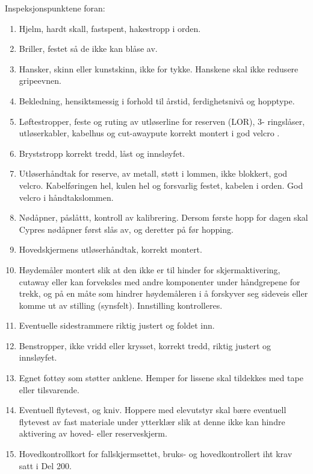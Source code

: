 Inspeksjonspunktene foran:
\begin{enumerate}
	\item Hjelm, hardt skall, fastspent, hakestropp i orden.
	\item Briller, festet så de ikke kan blåse av.
	\item Hansker, skinn eller kunstskinn, ikke for tykke. Hanskene skal ikke redusere gripeevnen.
	\item Bekledning, hensiktsmessig i forhold til årstid, ferdighetsnivå og hopptype.
	\item Løftestropper, feste og ruting av utløserline for reserven (LOR), 3- ringslåser, utløserkabler, kabelhus og cut-awaypute korrekt montert i god velcro .
	\item Bryststropp korrekt tredd, låst og innsløyfet.
	\item Utløserhåndtak for reserve, av metall, støtt i lommen, ikke blokkert, god velcro. Kabelføringen hel, kulen hel og forsvarlig festet, kabelen i orden. God velcro i håndtakslommen.
	\item Nødåpner, påslåttt, kontroll av kalibrering. Dersom første hopp for dagen skal Cypres nødåpner først slås av, og deretter på før hopping.
	\item Hovedskjermens utløserhåndtak, korrekt montert.
	\item Høydemåler montert slik at den ikke er til hinder for skjermaktivering, cutaway eller kan forveksles med andre komponenter under håndgrepene for trekk, og på en måte som hindrer høydemåleren i å forskyver seg sideveis eller komme ut av stilling (synsfelt). Innstilling kontrolleres.
	\item Eventuelle sidestrammere riktig justert og foldet inn.
	\item Benstropper, ikke vridd eller krysset, korrekt tredd, riktig justert og innsløyfet.
	\item Egnet fottøy som støtter anklene. Hemper for lissene skal tildekkes med tape eller tilsvarende.
	\item Eventuell flytevest, og kniv. Hoppere med elevutstyr skal bære eventuell flytevest av fast materiale under ytterklær slik at denne ikke kan hindre aktivering av hoved- eller reserveskjerm.
	\item Hovedkontrollkort for fallskjermsettet, bruks- og hovedkontrollert iht krav satt i Del 200.
\end{enumerate}

